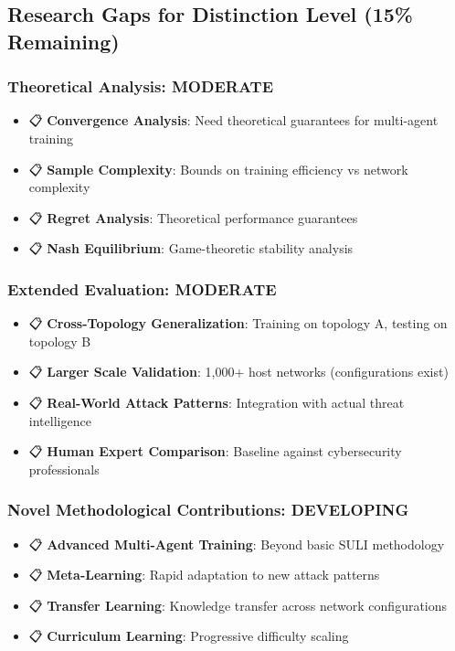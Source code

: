 \documentclass[11pt]{article}
\begin{document}
\subsection{Research Gaps for Distinction Level (15\% Remaining)}

\subsubsection{Theoretical Analysis: MODERATE}
\begin{itemize}
\item 📋 \textbf{Convergence Analysis}: Need theoretical guarantees for multi-agent training
\item 📋 \textbf{Sample Complexity}: Bounds on training efficiency vs network complexity
\item 📋 \textbf{Regret Analysis}: Theoretical performance guarantees
\item 📋 \textbf{Nash Equilibrium}: Game-theoretic stability analysis
\end{itemize}

\subsubsection{Extended Evaluation: MODERATE}
\begin{itemize}
\item 📋 \textbf{Cross-Topology Generalization}: Training on topology A, testing on topology B
\item 📋 \textbf{Larger Scale Validation}: 1,000+ host networks (configurations exist)
\item 📋 \textbf{Real-World Attack Patterns}: Integration with actual threat intelligence
\item 📋 \textbf{Human Expert Comparison}: Baseline against cybersecurity professionals
\end{itemize}

\subsubsection{Novel Methodological Contributions: DEVELOPING}
\begin{itemize}
\item 📋 \textbf{Advanced Multi-Agent Training}: Beyond basic SULI methodology
\item 📋 \textbf{Meta-Learning}: Rapid adaptation to new attack patterns
\item 📋 \textbf{Transfer Learning}: Knowledge transfer across network configurations
\item 📋 \textbf{Curriculum Learning}: Progressive difficulty scaling
\end{itemize}
\end{document}

